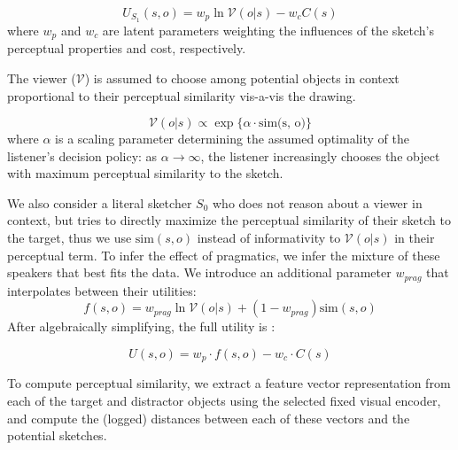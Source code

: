 \documentclass[9pt,twocolumn,twoside]{pnas-new}
\begin{document}
{\begin{equation} \label{sketcher_utility}
U_{S_1}(s, o) = w_p \ln \mathcal{V}(o|s) - w_c C(s)
\end{equation}
where $w_p$ and $w_c$ are latent parameters weighting the influences of the sketch's perceptual properties and cost, respectively.

The viewer ($\mathcal{V}$) is assumed to choose among potential objects in context proportional to their perceptual similarity vis-a-vis the drawing.

\begin{equation} \label{literal_viewer_score}
\mathcal{V}(o|s) \propto \exp\{\alpha \cdot \textrm{sim(s, o)}\}
\end{equation}
where $\alpha$ is a scaling parameter determining the assumed optimality of the listener's decision policy: as $\alpha \rightarrow \infty$, the listener increasingly chooses the object with maximum perceptual similarity to the sketch.

We also consider a literal sketcher $S_0$ who does not reason about a viewer in context, but tries to directly maximize the perceptual similarity of their sketch to the target, thus we use $\textrm{sim}(s, o)$ instead of informativity to $\mathcal{V}(o|s)$ in their perceptual term. To infer the effect of pragmatics, we infer the mixture of these speakers that best fits the data. We introduce an additional parameter $w_{prag}$ that interpolates between their utilities: $$f(s,o) = w_{prag}\ln \mathcal{V}(o | s) + (1-w_{prag}) \textrm{sim}(s,o)$$ After algebraically simplifying, the full utility is :

\begin{equation}
U(s,o) =  w_p \cdot  f(s,o) - w_c \cdot C(s)
\end{equation}

To compute perceptual similarity, we extract a feature vector representation from each of the target and distractor objects using the selected fixed visual encoder, and compute the (logged) distances between each of these vectors and the potential sketches.
}

\showmatmethods %


\showacknow{} %



\end{document}
